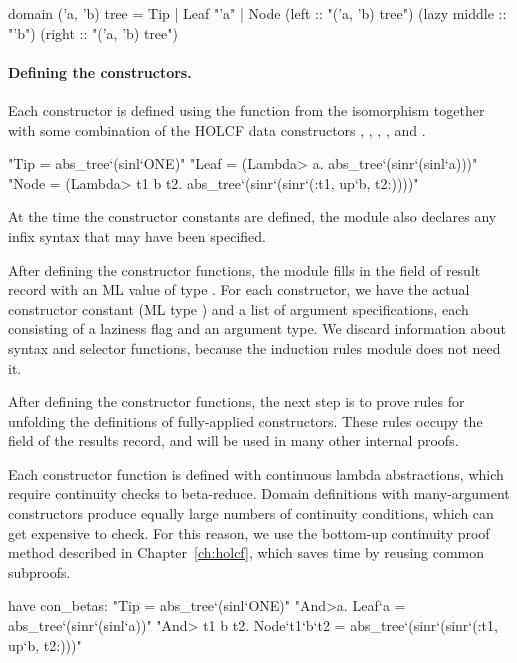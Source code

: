 \begin{isacode}
domain ('a, 'b) tree =
  Tip | Leaf "'a" |
  Node (left :: "('a, 'b) tree") (lazy middle :: "'b") (right :: "('a, 'b) tree")
\end{isacode}

\paragraph{Defining the constructors.} Each constructor is defined using the  function from the isomorphism together with some combination of the HOLCF data constructors , , , , and .
%
\begin{isacode}
  "Tip = abs_tree`(sinl`ONE)"
  "Leaf = (\<Lambda> a. abs_tree`(sinr`(sinl`a)))"
  "Node = (\<Lambda> t1 b t2. abs_tree`(sinr`(sinr`(:t1, up`b, t2:))))"
\end{isacode}
%
At the time the constructor constants are defined, the module also declares any infix syntax that may have been specified.

After defining the constructor functions, the module fills in the  field of result record with an ML value of type . For each constructor, we have the actual constructor constant (ML type ) and a list of argument specifications, each consisting of a laziness flag and an argument type. We discard information about syntax and selector functions, because the induction rules module does not need it.

After defining the constructor functions, the next step is to prove rules for unfolding the definitions of fully-applied constructors. These rules occupy the  field of the results record, and will be used in many other internal proofs.

Each constructor function is defined with continuous lambda abstractions, which require continuity checks to beta-reduce. Domain definitions with many-argument constructors produce equally large numbers of continuity conditions, which can get expensive to check. For this reason, we use the bottom-up continuity proof method described in Chapter~\ref{ch:holcf}, which saves time by reusing common subproofs.

\begin{isacode}
have con_betas:
  "Tip = abs_tree`(sinl`ONE)"
  "\<And>a. Leaf`a = abs_tree`(sinr`(sinl`a))"
  "\<And> t1 b t2. Node`t1`b`t2 = abs_tree`(sinr`(sinr`(:t1, up`b, t2:)))"
\end{isacode}

